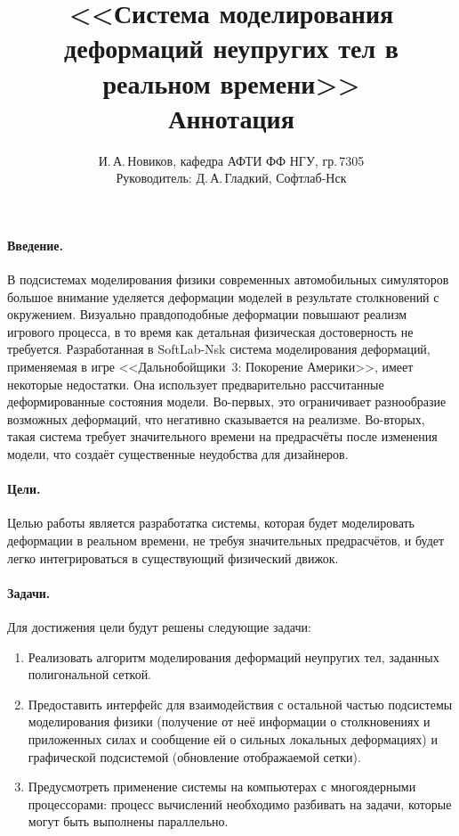 \documentclass[a4paper,11pt,twocolumn]{article}
\author{И.\,А.\,Новиков, кафедра АФТИ ФФ НГУ, гр.\,7305\\ Руководитель: Д.\,А.\,Гладкий, Софтлаб-Нск}
\title{<<Система моделирования деформаций неупругих тел в реальном времени>>\\ Аннотация}
\begin{document}
  \maketitle
  \thispagestyle{empty}
  \paragraph{Введение.}
    В подсистемах моделирования физики современных автомобильных симуляторов большое внимание
    уделяется деформации моделей в результате столкновений с окружением. Визуально
    правдоподобные деформации повышают реализм игрового процесса, в то время как детальная
    физическая достоверность не требуется. Разработанная в SoftLab-Nsk система моделирования
    деформаций, применяемая в игре <<Дальнобойщики~3: Покорение Америки>>, имеет некоторые
    недостатки.  Она использует предварительно рассчитанные деформированные состояния модели.
    Во-первых, это ограничивает разнообразие возможных деформаций, что негативно сказывается на
    реализме.  Во-вторых, такая система требует значительного времени на предрасчёты после изменения
    модели, что создаёт существенные неудобства для дизайнеров.
  \paragraph{Цели.}
    Целью работы является разработатка системы, которая будет моделировать деформации в реальном
    времени, не требуя значительных предрасчётов, и будет легко интегрироваться в существующий
    физический движок.
  \newpage
  \paragraph{Задачи.}
    Для достижения цели будут решены следующие задачи:
    \begin{enumerate}
      \item Реализовать алгоритм моделирования деформаций неупругих тел, заданных полигональной сеткой.
      \item Предоставить интерфейс для взаимодействия с остальной частью подсистемы моделирования
        физики (получение от неё информации о столкновениях и приложенных силах и сообщение ей о
        сильных локальных деформациях) и графической подсистемой (обновление отображаемой сетки).
      \item Предусмотреть применение системы на компьютерах с многоядерными процессорами: процесс
        вычислений необходимо разбивать на задачи, которые могут быть выполнены параллельно.
    \end{enumerate}
\end{document}
